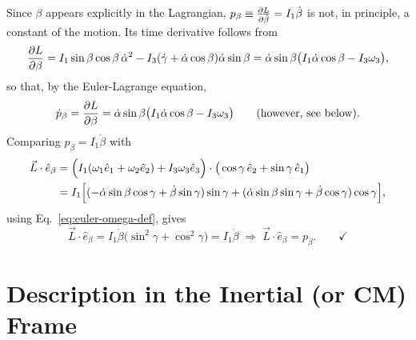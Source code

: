\documentclass[11pt]{article}
\newcommand{\ebeta}{\hat e_{\beta}}
\begin{document}
Since $\beta$ appears explicitly in the Lagrangian, $p_\beta\equiv\frac{\partial L}{\partial \dot\beta}=I_1\dot\beta$ is not, in principle, a constant of the motion. Its time derivative follows from
\begin{equation}
\frac{\partial L}{\partial \beta} = I_1\sin\beta\cos\beta\,\dot\alpha^2 - I_3(\dot\gamma+\dot\alpha\cos\beta)\dot\alpha\sin\beta = \dot\alpha\sin\beta\big(I_1\dot\alpha\cos\beta-I_3\omega_3\big),
\label{eq:dLdbeta}
\end{equation}
so that, by the Euler-Lagrange equation,
\begin{equation}
\dot p_\beta = \frac{\partial L}{\partial \beta} = \dot\alpha\sin\beta\big(I_1\dot\alpha\cos\beta-I_3\omega_3\big) \qquad (\text{however, see below}).
\label{eq:pbetadot}
\end{equation}
Comparing $p_\beta=I_1\dot\beta$ with
\begin{align}
\vec L\cdot\ebeta &= \Big(I_1(\omega_1\hat e_1+\omega_2\hat e_2)+I_3\omega_3\hat e_3\Big)\cdot\big(\cos\gamma\,\hat e_2+\sin\gamma\,\hat e_1\big)\notag\\
&= I_1\Big[(-\dot\alpha\sin\beta\cos\gamma+\dot\beta\sin\gamma)\sin\gamma+(\dot\alpha\sin\beta\sin\gamma+\dot\beta\cos\gamma)\cos\gamma\Big],
\label{eq:L-dot-ebeta}
\end{align}
using Eq.~\eqref{eq:euler-omega-def}, gives
\begin{equation}
\vec L\cdot\ebeta = I_1\dot\beta\big(\sin^2\gamma+\cos^2\gamma\big) = I_1\dot\beta \;\Rightarrow\; \boxed{\vec L\cdot\ebeta = p_\beta.} \qquad\checkmark
\label{eq:pbeta-verified}
\end{equation}

\section{Description in the Inertial (or CM) Frame}
\end{document}
